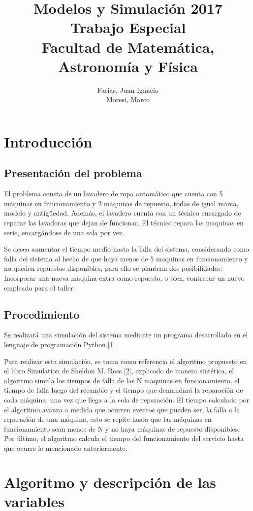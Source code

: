 \documentclass[11pt, spanish, a4paper]{article}
\author{
  Farias, Juan Ignacio\\
  Moresi, Marco\\
}
\title{\textbf{Modelos y Simulaci\'on 2017
\\Trabajo Especial\\ Facultad de Matem\'atica, Astronom\'ia y F\'isica}
}
\begin{document}
	\maketitle

\newpage
\section{Introducción}
\subsection{Presentaci\'on del problema}
El problema consta de un lavadero de ropa automático que cuenta con 5 máquinas en funcionamiento y 2 máquinas de repuesto, todas de igual marca, modelo y antigüedad. Además, el lavadero cuenta con un técnico encargado de reparar las lavadoras que dejan de funcionar. El técnico repara las maquinas en serie, encargándose de una sola por vez. 

Se desea aumentar el tiempo medio hasta la falla del sistema, considerando como falla del sistema al hecho de que haya menos de 5 maquinas en funcionamiento y no queden repuestos disponibles, para ello se plantean dos posibilidades: Incorporar una nueva maquina extra como repuesto, o bien, contratar un nuevo empleado para el taller.

\subsection{Procedimiento}
Se realizará una simulación del sistema mediante un programa desarrollado en el lenguaje de programación Python.\hyperref[repositorio]{[1]}

Para realizar esta simulación, se toma como referencia el algoritmo propuesto en el libro Simulation de Sheldon M. Ross \hyperref[libro]{[2]}, explicado de manera sintética, el algoritmo simula los tiempos de falla de las N maquinas en funcionamiento, el tiempo de falla luego del recambio y el tiempo que demandar\'a la reparaci\'on de cada m\'aquina, una vez que llega a la cola de reparaci\'on. El tiempo calculado por el algoritmo avanza a medida que ocurren eventos que pueden ser, la falla o la reparación de una m\'aquina, esto se repite hasta que las m\'aquinas en funcionamiento sean menos de N y no haya m\'aquinas de repuesto disponibles. Por \'ultimo, el algoritmo calcula el tiempo del funcionamiento del servicio hasta que ocurre lo mencionado anteriormente. 

\section{Algoritmo y descripci\'on de las variables}
\end{document}
